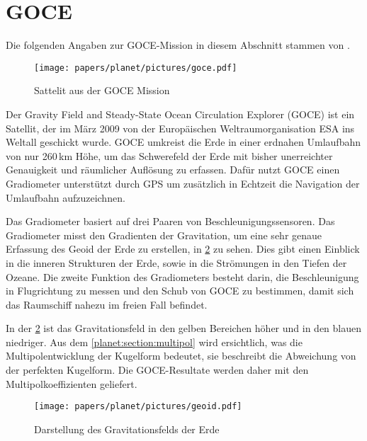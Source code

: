 %
%
%
%
\section{GOCE
\label{planet:section:goce}}

Die folgenden Angaben zur GOCE-Mission in diesem Abschnitt stammen von \cite{planet:goce}.

\begin{figure}[h]
    \centering
    \texttt{[image: papers/planet/pictures/goce.pdf]}
    \caption{Sattelit aus der GOCE Mission \cite{planet:gocepic}
        \label{planet:fig:goce}}
\end{figure}

Der Gravity Field and Steady-State Ocean Circulation Explorer (GOCE) ist ein Satellit, der im März 2009 von der Europäischen Weltraumorganisation ESA ins Weltall geschickt wurde.
GOCE umkreist die Erde in einer erdnahen Umlaufbahn von nur 260\,km Höhe, um das Schwerefeld der Erde mit bisher unerreichter Genauigkeit und räumlicher Auflösung zu erfassen.
Dafür nutzt GOCE einen Gradiometer unterstützt durch GPS um zusätzlich in Echtzeit die Navigation der Umlaufbahn aufzuzeichnen.

Das Gradiometer basiert auf drei Paaren von Beschleunigungssensoren.
Das Gradiometer misst den Gradienten der Gravitation, um eine sehr genaue Erfassung des Geoid der Erde zu erstellen, in \cref{planet:fig:geoid} zu sehen.
Dies gibt einen Einblick in die inneren Strukturen der Erde, sowie in die Strömungen in den Tiefen der Ozeane.
Die zweite Funktion des Gradiometers besteht darin, die Beschleunigung in Flugrichtung zu messen und den Schub von GOCE zu bestimmen, damit sich das Raumschiff nahezu im freien Fall befindet.

In der \cref{planet:fig:geoid} ist das Gravitationsfeld in den gelben Bereichen höher und in den blauen niedriger.
Aus dem \cref{planet:section:multipol} wird ersichtlich, was die Multipolentwicklung der Kugelform bedeutet, sie beschreibt die Abweichung von der perfekten Kugelform.
Die GOCE-Resultate werden daher mit den Multipolkoeffizienten geliefert.

\begin{figure}[h]
    \centering
    \texttt{[image: papers/planet/pictures/geoid.pdf]}
    \caption{Darstellung des Gravitationsfelds der Erde \cite{planet:geoidpic}
        \label{planet:fig:geoid}}
\end{figure}


